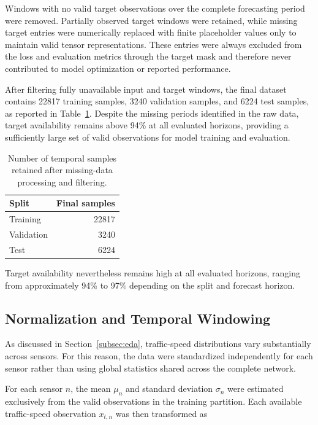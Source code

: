 Windows with no valid target observations over the complete forecasting
period were removed. Partially observed target windows were retained, while
missing target entries were numerically replaced with finite placeholder
values only to maintain valid tensor representations. These entries were
always excluded from the loss and evaluation metrics through the target
mask and therefore never contributed to model optimization or reported
performance.

After filtering fully unavailable input and target windows, the final dataset
contains 22817 training samples, 3240 validation samples, and 6224 test
samples, as reported in Table~\ref{tab:final_dataset}. Despite the missing
periods identified in the raw data, target availability remains above 94\%
at all evaluated horizons, providing a sufficiently large set of valid
observations for model training and evaluation.

\begin{table}[t]
    \centering
    \caption{Number of temporal samples retained after missing-data
    processing and filtering.}
    \label{tab:final_dataset}
    \begin{tabular}{lr}
        \toprule
        Split & Final samples \\
        \midrule
        Training   & 22817 \\
        Validation & 3240 \\
        Test       & 6224 \\
        \bottomrule
    \end{tabular}
\end{table}

Target availability nevertheless remains high at all evaluated horizons,
ranging from approximately 94\% to 97\% depending on the split and forecast
horizon.


\subsection{Normalization and Temporal Windowing}
\label{subsec:windowing}

As discussed in Section~\ref{subsec:eda}, traffic-speed distributions vary
substantially across sensors. For this reason, the data were standardized
independently for each sensor rather than using global statistics shared
across the complete network.

For each sensor $n$, the mean $\mu_n$ and standard deviation $\sigma_n$ were
estimated exclusively from the valid observations in the training partition.
Each available traffic-speed observation $x_{t,n}$ was then transformed as

